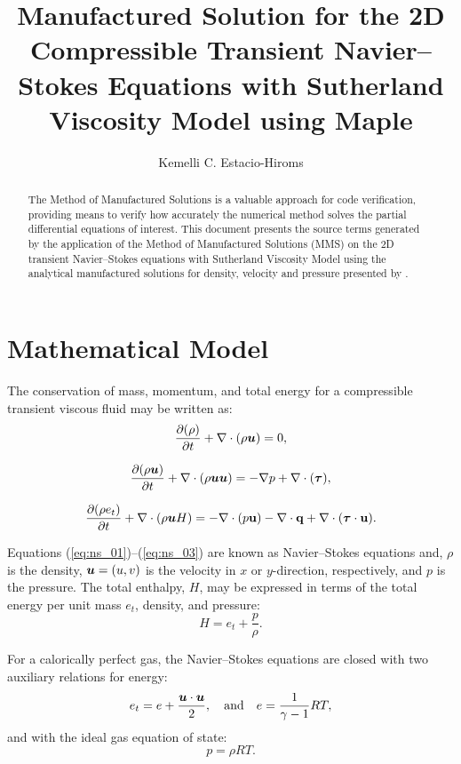 \documentclass[10pt]{article}
\title{Manufactured Solution for the 2D Compressible Transient Navier--Stokes Equations with Sutherland Viscosity Model using Maple\texttrademark}
\author{Kemelli C. Estacio-Hiroms}
\newcommand{\Diff}[2] {\dfrac{\partial( #1)}{\partial #2}}
\newcommand{\bv}[1]{\ensuremath{\mbox{\boldmath$ #1 $}}}
\begin{document}
\maketitle

\begin{abstract}
The Method of Manufactured Solutions is a valuable approach for code verification, providing means to verify how accurately the numerical method solves the partial differential equations of interest.
This document presents the source terms generated by the application of the Method of Manufactured Solutions (MMS) on the 2D transient Navier--Stokes equations  with Sutherland Viscosity Model using the analytical manufactured solutions for density, velocity and pressure presented by \citet{Roy2002}.
\end{abstract}





\section{Mathematical Model}
The conservation of mass, momentum, and total energy for a compressible transient viscous fluid may be written as:
\begin{equation}
 \label{eq:ns_01}
\Diff{\rho}{t} +\nabla \cdot \left(\rho \bv{u}\right) = 0,
\end{equation}

\begin{equation}
 \label{eq:ns_02}
\Diff{\rho \bv{u}}{t} +\nabla\cdot\left(\rho\bv{u}\bv{u}\right) = -\nabla p+  \nabla \cdot (\bv{\tau} ),
\end{equation}

\begin{equation}
 \label{eq:ns_03}
\Diff{\rho e_t}{t} +\nabla\cdot\left(\rho \bv{u} H\right) =-   \nabla\cdot(p  \mathbf{u}) -\nabla\cdot \mathbf{q} +  \nabla \cdot (\bv{\tau} \cdot \mathbf{u}).
\end{equation}


Equations (\ref{eq:ns_01})--(\ref{eq:ns_03}) are known as Navier--Stokes equations and, $\rho$ is the density, $\bv{u}=(u,v)$ is the velocity in $x$ or $y$-direction, respectively,    and $p$ is the pressure. The total enthalpy, $H$, may be expressed in terms of the total energy per unit mass $e_t$, density, and pressure:
$$H = e_t + \dfrac{p}{\rho}.$$

For a calorically perfect gas, the Navier--Stokes equations are closed with two auxiliary relations for energy:
\begin{equation}
 \label{eq:ns_04}
e_t= e+\dfrac{\bv{u}\cdot \bv{u}}{2},\quad\mbox{and}\quad e=\dfrac{1}{\gamma -1}RT ,
\end{equation}
and with the ideal gas equation of state:
\begin{equation}
 \label{eq:ns_05}
p=\rho RT.
\end{equation}
\end{document}
